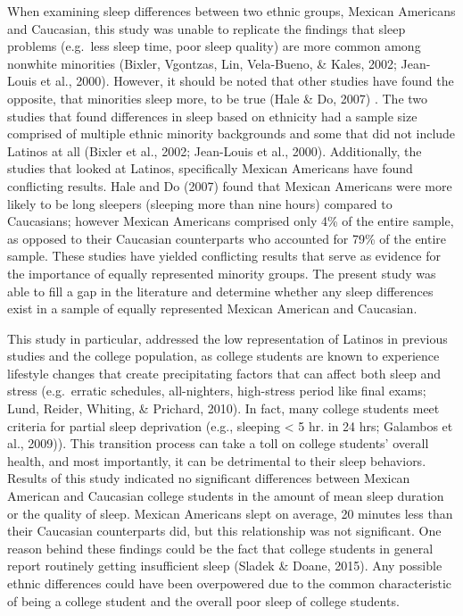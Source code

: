 \documentclass[man, fleqn, noextraspace]{apa6}
\begin{document}
When examining sleep differences between two ethnic groups, Mexican Americans and Caucasian, this study was unable to replicate the findings that sleep problems (e.g.~less sleep time, poor sleep quality) are more common among nonwhite minorities (Bixler, Vgontzas, Lin, Vela-Bueno, \& Kales, 2002; Jean-Louis et al., 2000). However, it should be noted that other studies have found the opposite, that minorities sleep more, to be true (Hale \& Do, 2007) . The two studies that found differences in sleep based on ethnicity had a sample size comprised of multiple ethnic minority backgrounds and some that did not include Latinos at all (Bixler et al., 2002; Jean-Louis et al., 2000). Additionally, the studies that looked at Latinos, specifically Mexican Americans have found conflicting results. Hale and Do (2007) found that Mexican Americans were more likely to be long sleepers (sleeping more than nine hours) compared to Caucasians; however Mexican Americans comprised only 4\% of the entire sample, as opposed to their Caucasian counterparts who accounted for 79\% of the entire sample. These studies have yielded conflicting results that serve as evidence for the importance of equally represented minority groups.
The present study was able to fill a gap in the literature and determine whether any sleep differences exist in a sample of equally represented Mexican American and Caucasian.

This study in particular, addressed the low representation of Latinos in previous studies and the college population, as college students are known to experience lifestyle changes that create precipitating factors that can affect both sleep and stress (e.g.~erratic schedules, all-nighters, high-stress period like final exams; Lund, Reider, Whiting, \& Prichard, 2010). In fact, many college students meet criteria for partial sleep deprivation (e.g., sleeping \textless{} 5 hr. in 24 hrs; Galambos et al., 2009)). This transition process can take a toll on college students' overall health, and most importantly, it can be detrimental to their sleep behaviors. Results of this study indicated no significant differences between Mexican American and Caucasian college students in the amount of mean sleep duration or the quality of sleep. Mexican Americans slept on average, 20 minutes less than their Caucasian counterparts did, but this relationship was not significant. One reason behind these findings could be the fact that college students in general report routinely getting insufficient sleep (Sladek \& Doane, 2015). Any possible ethnic differences could have been overpowered due to the common characteristic of being a college student and the overall poor sleep of college students.
\end{document}
